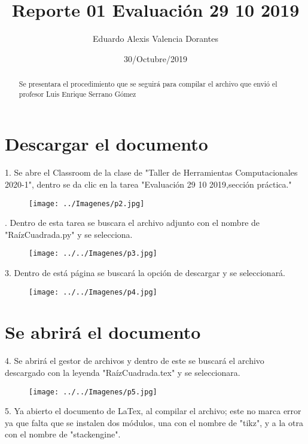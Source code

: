 \documentclass[letter,12pt]{article}
\title{Reporte 01 Evaluación 29 10 2019}
\author{Eduardo Alexis Valencia Dorantes}
\date{30/Octubre/2019}
\begin{document}
	

\begin{abstract}
Se presentara el procedimiento que se seguirá para compilar el archivo que envió el profesor Luis Enrique Serrano Gómez
\end{abstract}

\section*{Descargar el documento}
1. Se abre el Classroom de la clase de "Taller de Herramientas Computacionales 2020-1", dentro se da clic en la tarea "Evaluación 29 10 2019,sección práctica."

\begin{figure}[h]
	\centering
	\texttt{[image: ../Imagenes/p2.jpg]}
	\caption{}
	\label{fig:p2}
\end{figure}

. Dentro de esta tarea se buscara el archivo adjunto con el nombre de "RaízCuadrada.py" y se selecciona.

\begin{figure}[h]
	\centering
	\texttt{[image: ../../Imagenes/p3.jpg]}
	\caption{}
	\label{fig:p3}
\end{figure}


3. Dentro de está página se buscará la opción de descargar y se seleccionará.

\begin{figure}[h]
	\centering
	\texttt{[image: ../../Imagenes/p4.jpg]}
	\caption{}
	\label{fig:p4}
\end{figure}
\newpage
\section*{Se abrirá el documento}
4. Se abrirá el gestor de archivos y dentro de este se buscará el archivo descargado con la leyenda "RaízCuadrada.tex" y se seleccionara.

\begin{figure}[h]
	\centering
	\texttt{[image: ../../Imagenes/p5.jpg]}
	\caption{}
	\label{fig:p5}
\end{figure}

5. Ya abierto el documento de LaTex, al compilar el archivo; este no marca error ya que falta que se instalen dos módulos, una con el nombre de "tikz", y a la otra con el nombre de "stackengine".
\end{document}
